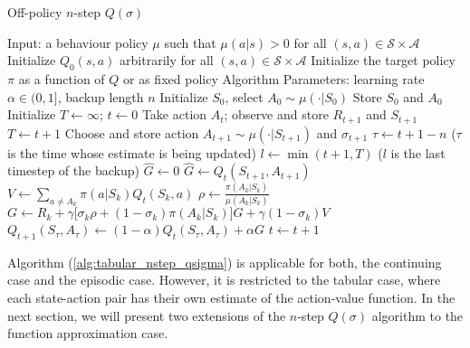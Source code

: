 \begin{algorithm}[H]
	\caption{Off-policy $n$-step $Q(\sigma)$}
	\label{alg:tabular_nstep_qsigma}
	\begin{algorithmic}[1]
    	\STATE Input: a behaviour policy $\mu$ such that $\mu(a|s) > 0$ for all 
        		$(s,a) \in \mathcal{S} \times \mathcal{A}$
		\STATE Initialize $Q_0(s,a)$ arbitrarily for all $(s,a) \in \mathcal{S} \times \mathcal{A}$
        \STATE Initialize the target policy $\pi$ as a function of $Q$ or as fixed policy
        \STATE Algorithm Parameters: learning rate $\alpha \in (0,1]$, backup length $n$
        	\STATE Initialize $S_0$, select $A_0 \sim \mu(\cdot | S_0)$
            \STATE Store $S_0$ and $A_0$
            \STATE Initialize $T \leftarrow \infty$; $t \leftarrow 0$
            		\STATE Take action $A_t$; observe and store $R_{t+1}$ and $S_{t+1}$
                		\STATE $T \leftarrow t+1$
					\ELSE
                      	\STATE Choose and store action $A_{t+1} \sim \mu(\cdot| S_{t+1})$ and 
                        	$\sigma_{t+1}$
                  	\ENDIF
                \ENDIF
                \STATE $\tau \leftarrow t + 1 - n$ ($\tau$ is the time whose estimate is being
                		updated)
                    \STATE $l \leftarrow \min(t+1, T)$ ($l$ is the last timestep of the backup)
                    	\STATE $\hat{G} \leftarrow 0$
                    \ELSE
                    	\STATE $\hat{G} \leftarrow Q_t(S_{t+1}, A_{t+1})$
                    \ENDIF
                        \STATE $V \leftarrow \sum_{a \neq A_k} \pi(a|S_{k}) Q_t(S_{k}, a)$
                        \STATE $\rho \leftarrow \frac{\pi(A_k|S_k)}{\mu(A_k| S_k)}$
                        \STATE $G \leftarrow R_k + \gamma \big[ \sigma_k \rho + 
                        		(1-\sigma_k) \pi(A_k|S_k)\big] G + \gamma (1-\sigma_k) V$
                    \ENDFOR
                    \STATE 	$Q_{t+1}(S_\tau, A_\tau) 
                    		\leftarrow (1-\alpha) Q_t(S_\tau, A_\tau) + \alpha G$
                \ENDIF
                \STATE $t \leftarrow t + 1$
            \ENDWHILE
        \ENDFOR
	\end{algorithmic}
\end{algorithm}

Algorithm (\ref{alg:tabular_nstep_qsigma}) is applicable for both, the continuing case and the episodic case.
However, it is restricted to the tabular case, where each state-action pair has their own estimate of the action-value function.
In the next section, we will present two extensions of the $n$-step $Q(\sigma)$ algorithm to the function approximation case.

